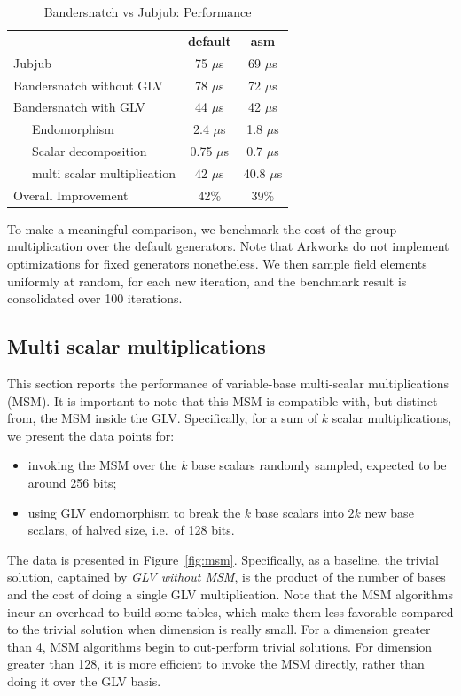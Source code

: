 \documentclass[version=preprint]{iacrcc}
\begin{document}
\begin{table}[!ht]
  \centering%
  \begin{tabularx}{\textwidth}{lcc}
      & \textbf{default} & \textbf{asm}\\
    Jubjub & 75 $\mu$s & 69 $\mu$s \\
    Bandersnatch without GLV & 78 $\mu$s & 72 $\mu$s  \\   
    Bandersnatch with GLV& 44 $\mu$s & 42 $\mu$s \\
    \ \ \ Endomorphism & 2.4 $\mu$s& 1.8 $\mu$s\\
    \ \ \ Scalar decomposition & 0.75 $\mu$s & 0.7 $\mu$s \\
    \ \ \ multi scalar multiplication & 42 $\mu$s &  40.8 $\mu$s\\
    Overall Improvement & 42\% & 39\% \\
  \end{tabularx}
  \caption{Bandersnatch vs Jubjub: Performance}
  \label{tab:comp_full}
\end{table}

To make a meaningful comparison, we benchmark
the cost of the group multiplication over the default generators.
Note that Arkworks do not implement optimizations for 
fixed generators nonetheless. We then sample field elements 
uniformly at random, for each new iteration, and the benchmark
result is consolidated over 100 iterations.

\subsection{Multi scalar multiplications}
This section reports the performance of variable-base multi-scalar multiplications (MSM). It is important to note that this MSM is compatible with, but distinct from, the MSM inside the GLV. Specifically, for a sum of $k$ scalar multiplications, we present the data points for:

\begin{itemize}
  \item invoking the MSM over the $k$ base scalars randomly sampled,
    expected to be around 256 bits;
  \item using GLV endomorphism to break the $k$ base scalars into $2k$
    new base scalars, of halved size, i.e.~of 128 bits.
\end{itemize}
The data is presented in Figure~\ref{fig:msm}. Specifically, 
as a baseline, the trivial solution, captained by 
{\em GLV without 
MSM}, is the product of the number of bases and the cost of
doing a single GLV multiplication. 
Note that the MSM algorithms incur an overhead to build some
tables, which make them less favorable compared to the trivial
solution when dimension is really small. For a dimension greater 
than 4, MSM algorithms begin to out-perform trivial solutions.
For dimension greater than 128, it is more efficient to 
invoke the MSM directly, rather than doing it over the GLV basis.
\end{document}
